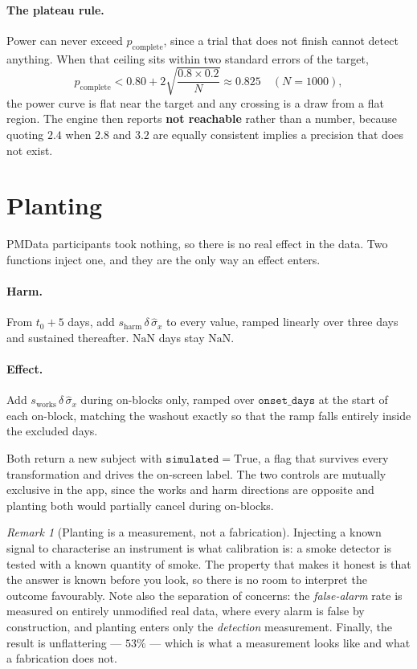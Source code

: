 \documentclass{article}
\theoremstyle{plain}
\theoremstyle{definition}
\theoremstyle{remark}
\newtheorem{remark}{Remark}[section]
\numberwithin{equation}{section}
\begin{document}
\paragraph{The plateau rule.} Power can never exceed $p_{\mathrm{complete}}$,
since a trial that does not finish cannot detect anything. When that ceiling
sits within two standard errors of the target,
\[
  p_{\mathrm{complete}} < 0.80 + 2\sqrt{\frac{0.8 \times 0.2}{N}} \approx 0.825
  \quad (N = 1000),
\]
the power curve is flat near the target and any crossing is a draw from a flat
region. The engine then reports \textbf{not reachable} rather than a number,
because quoting $2.4$ when $2.8$ and $3.2$ are equally consistent implies a
precision that does not exist.

\section{Planting}

PMData participants took nothing, so there is no real effect in the data. Two
functions inject one, and they are the only way an effect enters.

\paragraph{Harm.} From $t_0 + 5$ days, add
$s_{\mathrm{harm}}\,\delta\,\hat\sigma_x$ to every value, ramped linearly over
three days and sustained thereafter. $\mathrm{NaN}$ days stay $\mathrm{NaN}$.

\paragraph{Effect.} Add $s_{\mathrm{works}}\,\delta\,\hat\sigma_x$ during
on-blocks only, ramped over $\texttt{onset\_days}$ at the start of each
on-block, matching the washout exactly so that the ramp falls entirely inside
the excluded days.

Both return a new subject with $\texttt{simulated} = \mathrm{True}$, a flag
that survives every transformation and drives the on-screen label. The two
controls are mutually exclusive in the app, since the works and harm directions
are opposite and planting both would partially cancel during on-blocks.

\begin{remark}[Planting is a measurement, not a fabrication]
Injecting a known signal to characterise an instrument is what calibration is:
a smoke detector is tested with a known quantity of smoke. The property that
makes it honest is that the answer is known before you look, so there is no
room to interpret the outcome favourably. Note also the separation of concerns:
the \emph{false-alarm} rate is measured on entirely unmodified real data, where
every alarm is false by construction, and planting enters only the
\emph{detection} measurement. Finally, the result is unflattering --- $53\%$ ---
which is what a measurement looks like and what a fabrication does not.
\end{remark}
\end{document}
